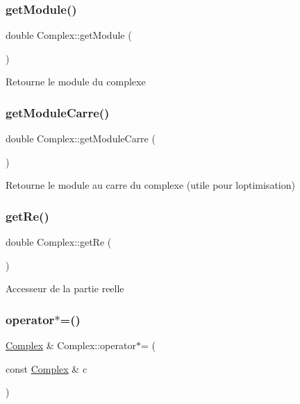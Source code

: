 \subsubsection{\texorpdfstring{get\+Module()}{getModule()}}
{\footnotesize\ttfamily double Complex\+::get\+Module (\begin{DoxyParamCaption}{ }\end{DoxyParamCaption})}

Retourne le module du complexe \mbox{\label{classComplex_a6d0e1c55b4986f03850adaace198824e}} 
\subsubsection{\texorpdfstring{get\+Module\+Carre()}{getModuleCarre()}}
{\footnotesize\ttfamily double Complex\+::get\+Module\+Carre (\begin{DoxyParamCaption}{ }\end{DoxyParamCaption})}

Retourne le module au carre du complexe (utile pour l\textquotesingle{}optimisation) \mbox{\label{classComplex_a5e43de61a58eab8420b70eb2974e6b0b}} 
\subsubsection{\texorpdfstring{get\+Re()}{getRe()}}
{\footnotesize\ttfamily double Complex\+::get\+Re (\begin{DoxyParamCaption}{ }\end{DoxyParamCaption})}

Accesseur de la partie reelle \mbox{\label{classComplex_a2f5beb61c61de440c20e69decc584952}} 
\subsubsection{\texorpdfstring{operator$\ast$=()}{operator*=()}}
{\footnotesize\ttfamily \hyperlink{classComplex}{Complex} \& Complex\+::operator$\ast$= (\begin{DoxyParamCaption}\item[{const \hyperlink{classComplex}{Complex} \&}]{c }\end{DoxyParamCaption})}

